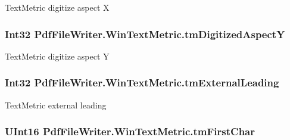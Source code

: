 Text\+Metric digitize aspect X 

\subsubsection[{\texorpdfstring{tm\+Digitized\+AspectY}{tmDigitizedAspectY}}]{\setlength{\rightskip}{0pt plus 5cm}Int32 Pdf\+File\+Writer.\+Win\+Text\+Metric.\+tm\+Digitized\+AspectY\hspace{0.3cm}{\ttfamily [get]}}\hypertarget{class_pdf_file_writer_1_1_win_text_metric_a31d296488e4cf7ca0696c207378e39ec}{}\label{class_pdf_file_writer_1_1_win_text_metric_a31d296488e4cf7ca0696c207378e39ec}


Text\+Metric digitize aspect Y 

\subsubsection[{\texorpdfstring{tm\+External\+Leading}{tmExternalLeading}}]{\setlength{\rightskip}{0pt plus 5cm}Int32 Pdf\+File\+Writer.\+Win\+Text\+Metric.\+tm\+External\+Leading\hspace{0.3cm}{\ttfamily [get]}}\hypertarget{class_pdf_file_writer_1_1_win_text_metric_a3d04723b2afe704c3ec97d6a13938199}{}\label{class_pdf_file_writer_1_1_win_text_metric_a3d04723b2afe704c3ec97d6a13938199}


Text\+Metric external leading 

\subsubsection[{\texorpdfstring{tm\+First\+Char}{tmFirstChar}}]{\setlength{\rightskip}{0pt plus 5cm}U\+Int16 Pdf\+File\+Writer.\+Win\+Text\+Metric.\+tm\+First\+Char\hspace{0.3cm}{\ttfamily [get]}}\hypertarget{class_pdf_file_writer_1_1_win_text_metric_a3d33f0e070d451b970a8b6a70a2efd73}{}\label{class_pdf_file_writer_1_1_win_text_metric_a3d33f0e070d451b970a8b6a70a2efd73}


